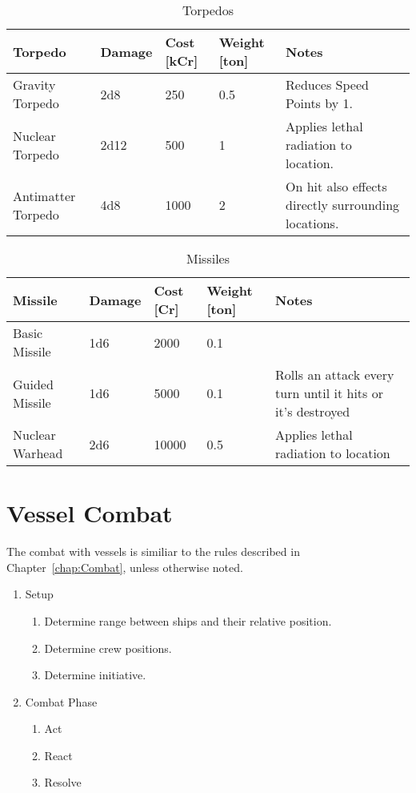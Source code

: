 \begin{table}
  \centering
  \caption{Torpedos}
    \begin{tabularx}{\textwidth}{|l|l|p{1.1cm}|p{1.2cm}|X|}
    \hline
    Torpedo            & Damage & Cost [kCr] & Weight [ton] & Notes                                               \\ \hline
    Gravity Torpedo    & 2d8    & 250        & 0.5             & Reduces Speed Points by 1.                          \\ \hline
    Nuclear Torpedo    & 2d12   & 500        & 1             & Applies lethal radiation to location.               \\ \hline
    Antimatter Torpedo & 4d8    & 1000       & 2             & On hit also effects directly surrounding locations. \\ \hline
  \end{tabularx}
\end{table}

\begin{table}
  \centering
  \caption{Missiles}
    \begin{tabularx}{\textwidth}{|l|l|p{1.1cm}|p{1.2cm}|X|}
    \hline
    Missile         & Damage & Cost [Cr] & Weight [ton] & Notes                                                      \\ \hline
    Basic Missile   & 1d6    & 2000      & 0.1     & ~                                                          \\ \hline
    Guided Missile  & 1d6    & 5000      & 0.1     & Rolls an attack every turn until it hits or it's destroyed \\ \hline
    Nuclear Warhead & 2d6    & 10000     & 0.5     & Applies lethal radiation to location                       \\ \hline
  \end{tabularx}
\end{table}

\chapter{Vessel Combat}
\label{chap:Vessel Combat}

The combat with vessels is similiar to the rules described in Chapter~\ref{chap:Combat}, unless otherwise noted.

\begin{enumerate}
  \item Setup
  \begin{enumerate}
    \item Determine range between ships and their relative position.
    \item Determine crew positions.
    \item Determine initiative.
  \end{enumerate}
  \item Combat Phase
  \begin{enumerate}
    \item Act
    \item React
    \item Resolve
  \end{enumerate}
\end{enumerate}

